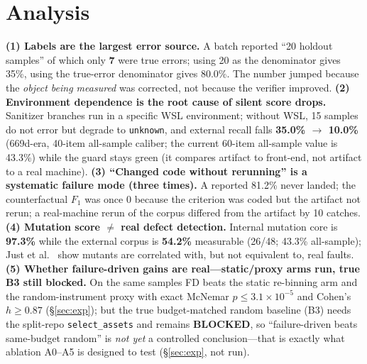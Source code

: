 \documentclass{article}
\begin{document}
\section{Analysis}
\label{sec:analysis}
\textbf{(1) Labels are the largest error source.} A batch reported ``20 holdout samples'' of which
only \textbf{7} were true errors; using 20 as the denominator gives 35\%, using the true-error
denominator gives 80.0\%. The number jumped because the \emph{object being measured} was corrected,
not because the verifier improved.
\textbf{(2) Environment dependence is the root cause of silent score drops.} Sanitizer branches run
in a specific WSL environment; without WSL, 15 samples do not error but degrade to
\texttt{unknown}, and external recall falls \textbf{35.0\% $\to$ 10.0\%} (669d-era, 40-item
all-sample caliber; the current 60-item all-sample value is 43.3\%) while the guard stays green
(it compares artifact to front-end, not artifact to a real machine).
\textbf{(3) ``Changed code without rerunning'' is a systematic failure mode (three times).} A
reported 81.2\% never landed; the counterfactual $F_1$ was once 0 because the criterion was coded
but the artifact not rerun; a real-machine rerun of the corpus differed from the artifact by 10
catches.
\textbf{(4) Mutation score $\neq$ real defect detection.} Internal mutation core is \textbf{97.3\%}
while the external corpus is \textbf{54.2\%} measurable (26/48; 43.3\% all-sample); Just et
al.~\cite{just2014mutants} show mutants are correlated with, but not equivalent to, real faults.
\textbf{(5) Whether failure-driven gains are real---static/proxy arms run, true B3 still blocked.}
On the same samples FD beats the static re-binning arm and the random-instrument proxy with exact
McNemar $p\le3.1\times10^{-5}$ and Cohen's $h\ge0.87$ (\S\ref{sec:exp}); but the true
budget-matched random baseline (B3) needs the split-repo \texttt{select\_assets} and remains
\textbf{BLOCKED}, so ``failure-driven beats same-budget random'' is \emph{not yet} a controlled
conclusion---that is exactly what ablation A0--A5 is designed to test (\S\ref{sec:exp}, not run).

\end{document}
